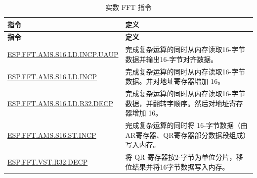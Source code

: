 \begin{longtable}[c]{|l|m{10cm}|}
    \caption{实数 FFT 指令}
    \label{tab:pie-real-fft-instructions}\\
    \hline
    \rowcolor{lightgray}
    \textbf{指令} & \textbf{定义} \\\hline
    \endfirsthead
    \rowcolor{lightgray}
    \textbf{指令} & \textbf{定义} \\\hline
    \endhead
    \endfoot

    \hyperref[instruction:ESPFFTAMSS16LDINCPUAUP]{ESP.FFT.AMS.S16.LD.INCP.UAUP} & 完成复杂运算的同时从内存读取16-字节数据并输出16-字节对齐数据。
    \\\hline
    \hyperref[instruction:ESPFFTAMSS16LDINCP]{ESP.FFT.AMS.S16.LD.INCP} & 完成复杂运算的同时从内存读取16-字节数据。并对地址寄存器增加 16。
    \\\hline
    \hyperref[instruction:ESPFFTAMSS16LDR32DECP]{ESP.FFT.AMS.S16.LD.R32.DECP} & 完成复杂运算的同时从内存读取16-字节数据，并翻转字顺序。然后对地址寄存器增加 16。
    \\\hline
    \hyperref[instruction:ESPFFTAMSS16STINCP]{ESP.FFT.AMS.S16.ST.INCP} & 完成复杂运算的同时将 16-字节数据（由AR寄存器、QR寄存器部分数据段组成）写入内存。
    \\\hline
    \hyperref[instruction:ESPFFTVSTR32DECP]{ESP.FFT.VST.R32.DECP} & 将 QR 寄存器按2-字节为单位分片，移位结果并将16字节数据写入内存。
    \\\hline
\end{longtable}